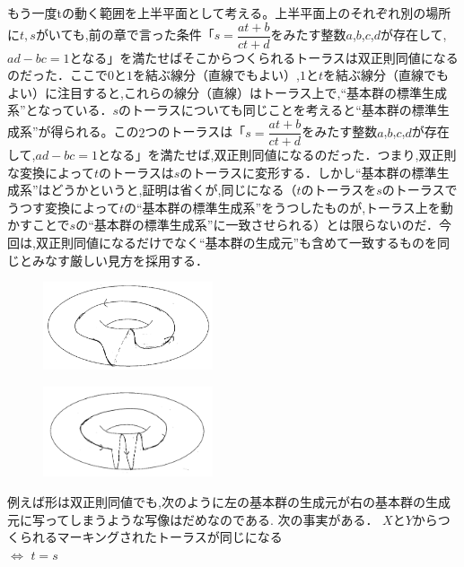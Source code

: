 もう一度tの動く範囲を上半平面として考える。上半平面上のそれぞれ別の場所に$t,s$がいても,前の章で言った条件「$s=\dfrac {at+b} {ct+d}$をみたす整数$a$,$b$,$c$,$d$が存在して,$ad-bc=1$となる」を満たせばそこからつくられるトーラスは双正則同値になるのだった．ここで$0$と$1$を結ぶ線分（直線でもよい）,$1$と$t$を結ぶ線分（直線でもよい）に注目すると,これらの線分（直線）はトーラス上で,``基本群の標準生成系''となっている．$s$のトーラスについても同じことを考えると``基本群の標準生成系''が得られる。この$2$つのトーラスは「$s=\dfrac {at+b} {ct+d}$をみたす整数$a$,$b$,$c$,$d$が存在して,$ad-bc=1$となる」を満たせば,双正則同値になるのだった．つまり,双正則な変換によって$t$のトーラスは$s$のトーラスに変形する．しかし``基本群の標準生成系''はどうかというと,証明は省くが,同じになる（$t$のトーラスを$s$のトーラスでうつす変換によって$t$の``基本群の標準生成系''をうつしたものが,トーラス上を動かすことで$s$の``基本群の標準生成系''に一致させられる）とは限らないのだ．今回は,双正則同値になるだけでなく``基本群の生成元''も含めて一致するものを同じとみなす厳しい見方を採用する．\\
\begin{figure}[h]
\begin{minipage}{0.5\hsize}
\includegraphics[width=5cm]{asaka12.png}\\
\end{minipage}
\begin{minipage}{0.5\hsize}
\includegraphics[width=5cm]{asaka14.png}\\
\end{minipage}
\end{figure}
例えば形は双正則同値でも,次のように左の基本群の生成元が右の基本群の生成元に写ってしまうような写像はだめなのである.
次の事実がある．
\thm
$X$と$Y$からつくられるマーキングされたトーラスが同じになる\\
$\Leftrightarrow $ $t=s$
\thmx
